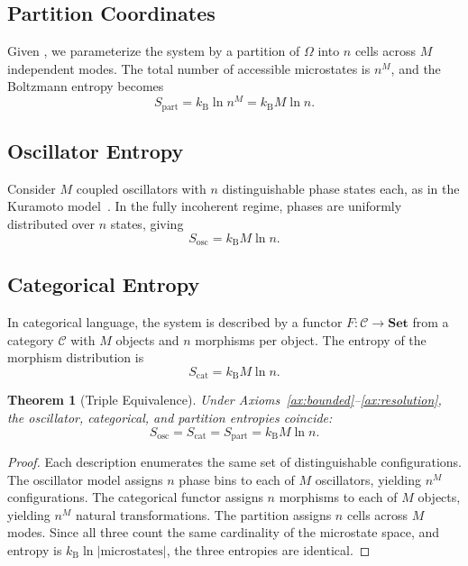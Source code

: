 \documentclass[10pt,twocolumn]{article}
\newtheorem{theorem}{Theorem}[section]
\theoremstyle{definition}
\theoremstyle{remark}
\newcommand{\kB}{k_{\mathrm{B}}}
\newcommand{\Sosc}{S_{\mathrm{osc}}}
\newcommand{\Scat}{S_{\mathrm{cat}}}
\newcommand{\Spart}{S_{\mathrm{part}}}
\begin{document}
\subsection{Partition Coordinates}

Given , we parameterize the system
by a partition of $\Omega$ into $n$ cells across $M$ independent
modes.  The total number of accessible microstates is $n^M$, and
the Boltzmann entropy becomes
\begin{equation}\label{eq:partition_entropy}
  \Spart = \kB \ln n^M = \kB M \ln n.
\end{equation}

\subsection{Oscillator Entropy}

Consider $M$ coupled oscillators with $n$ distinguishable phase
states each, as in the Kuramoto model~\cite{Kuramoto1984,Strogatz2000,Acebron2005}.
In the fully incoherent regime, phases are uniformly distributed
over $n$ states, giving
\begin{equation}\label{eq:osc_entropy}
  \Sosc = \kB M \ln n.
\end{equation}

\subsection{Categorical Entropy}

In categorical language, the system is described by a functor
$F\colon \mathcal{C} \to \mathbf{Set}$ from a category $\mathcal{C}$
with $M$ objects and $n$ morphisms per object.  The entropy of the
morphism distribution is
\begin{equation}\label{eq:cat_entropy}
  \Scat = \kB M \ln n.
\end{equation}

\begin{theorem}[Triple Equivalence]\label{thm:triple}
Under Axioms~\ref{ax:bounded}--\ref{ax:resolution}, the oscillator,
categorical, and partition entropies coincide:
\begin{equation}
  \boxed{\Sosc = \Scat = \Spart = \kB M \ln n.}
\end{equation}
\end{theorem}

\begin{proof}
Each description enumerates the same set of distinguishable
configurations.  The oscillator model assigns $n$ phase bins
to each of $M$ oscillators, yielding $n^M$ configurations.
The categorical functor assigns $n$ morphisms to each of $M$
objects, yielding $n^M$ natural transformations.  The partition
assigns $n$ cells across $M$ modes.  Since all three count the
same cardinality of the microstate space, and entropy is
$\kB \ln|\text{microstates}|$, the three entropies are identical.
\end{proof}
\end{document}
